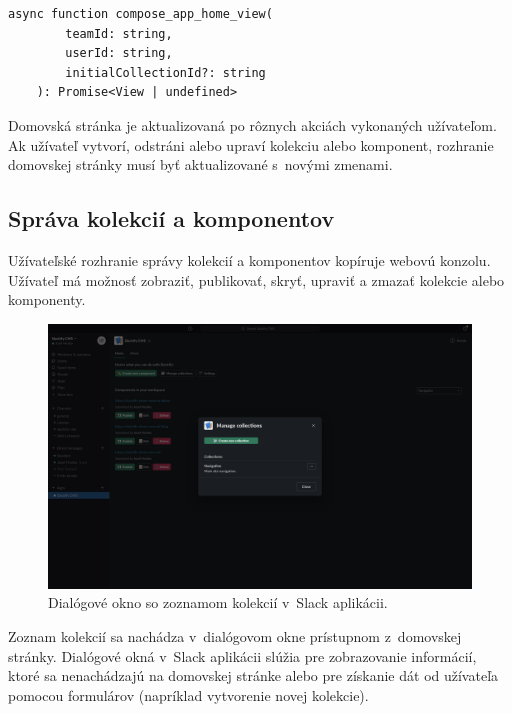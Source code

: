 \begin{lstlisting}[caption={Funkcia zodpovedná za generovanie rozhrania domovskej stránky.}]
	async function compose_app_home_view(
		teamId: string,
		userId: string,
		initialCollectionId?: string
	): Promise<View | undefined>
\end{lstlisting}

\medskip

\noindent Domovská stránka je aktualizovaná po rôznych akciách vykonaných užívateľom. Ak užívateľ vytvorí, odstráni alebo upraví kolekciu alebo komponent, rozhranie domovskej stránky musí byť aktualizované s~novými zmenami.

\subsection{Správa kolekcií a komponentov}
Užívateľské rozhranie správy kolekcií a komponentov kopíruje webovú konzolu. Užívateľ má možnosť zobraziť, publikovať, skryť, upraviť a zmazať kolekcie alebo komponenty.

\begin{figure}[h]
	\centering
	\includegraphics[scale=0.085]{obrazky-figures/screenshot_slack_collections}
	\caption{Dialógové okno so zoznamom kolekcií v~Slack aplikácii.}
\end{figure}

\noindent Zoznam kolekcií sa nachádza v~dialógovom okne prístupnom z~domovskej stránky. Dialógové okná v~Slack aplikácii slúžia pre zobrazovanie informácií, ktoré sa nenachádzajú na domovskej stránke alebo pre získanie dát od užívateľa pomocou formulárov (napríklad vytvorenie novej kolekcie).

